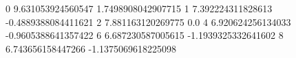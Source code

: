 0 9.631053924560547 1.7498908042907715
1 7.392224311828613 -0.4889388084411621
2 7.881163120269775 0.0
4 6.920624256134033 -0.9605388641357422
6 6.687230587005615 -1.1939325332641602
8 6.743656158447266 -1.1375069618225098
